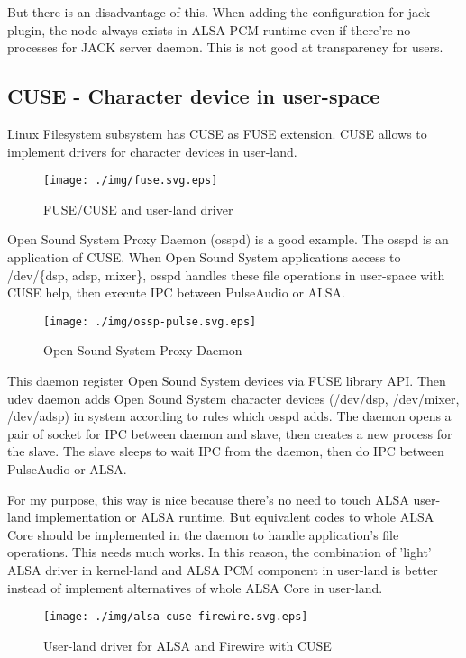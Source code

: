 \documentclass[onecolumn]{article}
\begin{document}
But there is an disadvantage of this. When adding the configuration for jack plugin, the node always exists in ALSA PCM runtime even if there're no processes for JACK server daemon. This is not good at transparency for users.


\subsection{CUSE - Character device in user-space}
Linux Filesystem subsystem has CUSE as FUSE extension. CUSE allows to implement drivers for character devices in user-land.

\begin{figure}[H]
	\centering
	\texttt{[image: ./img/fuse.svg.eps]}
	\caption{{FUSE/CUSE and user-land driver}}
	\label{fuse}
\end{figure}

Open Sound System Proxy Daemon (osspd) is a good example. The osspd is an application of CUSE. When Open Sound System applications access to /dev/\{dsp, adsp, mixer\}, osspd handles these file operations in user-space with CUSE help, then execute IPC between PulseAudio or ALSA.

\begin{figure}[H]
	\centering
	\texttt{[image: ./img/ossp-pulse.svg.eps]}
	\caption{{Open Sound System Proxy Daemon}}
	\label{osspd_pulse}
\end{figure}


This daemon register Open Sound System devices via FUSE library API. Then udev daemon adds Open Sound System character devices (/dev/dsp, /dev/mixer, /dev/adsp) in system according to rules which osspd adds. The daemon opens a pair of socket for IPC between daemon and slave, then creates a new process for the slave. The slave sleeps to wait IPC from the daemon, then do IPC between PulseAudio or ALSA.

For my purpose, this way is nice because there's no need to touch ALSA user-land implementation or ALSA runtime. But equivalent codes to whole ALSA Core should be implemented in the daemon to handle application's file operations. This needs much works. In this reason, the combination of 'light' ALSA driver in kernel-land and ALSA PCM component in user-land is better instead of implement alternatives of whole ALSA Core in user-land.

\begin{figure}[H]
	\centering
	\texttt{[image: ./img/alsa-cuse-firewire.svg.eps]}
	\caption{{User-land driver for ALSA and Firewire with CUSE}}
	\label{alsa_cuse_firewire}
\end{figure}
\end{document}
